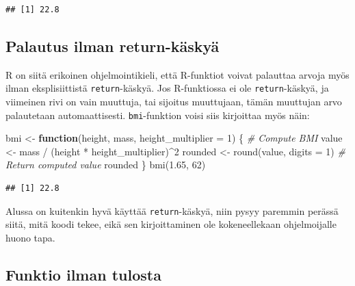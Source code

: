 \documentclass[
]{book}
\newenvironment{Shaded}{\begin{snugshade}}{\end{snugshade}}
\newcommand{\AttributeTok}[1]{\textcolor[rgb]{0.77,0.63,0.00}{#1}}
\newcommand{\CommentTok}[1]{\textcolor[rgb]{0.56,0.35,0.01}{\textit{#1}}}
\newcommand{\ControlFlowTok}[1]{\textcolor[rgb]{0.13,0.29,0.53}{\textbf{#1}}}
\newcommand{\DecValTok}[1]{\textcolor[rgb]{0.00,0.00,0.81}{#1}}
\newcommand{\FloatTok}[1]{\textcolor[rgb]{0.00,0.00,0.81}{#1}}
\newcommand{\FunctionTok}[1]{\textcolor[rgb]{0.00,0.00,0.00}{#1}}
\newcommand{\NormalTok}[1]{#1}
\newcommand{\OtherTok}[1]{\textcolor[rgb]{0.56,0.35,0.01}{#1}}
\newcommand{\SpecialCharTok}[1]{\textcolor[rgb]{0.00,0.00,0.00}{#1}}
\begin{document}
\begin{Shaded}
\end{Shaded}

\begin{verbatim}
## [1] 22.8
\end{verbatim}

\hypertarget{palautus-ilman-return-kuxe4skyuxe4}{%
\subsection{Palautus ilman return-käskyä}\label{palautus-ilman-return-kuxe4skyuxe4}}

R on siitä erikoinen ohjelmointikieli, että R-funktiot voivat palauttaa arvoja myös ilman eksplisiittistä \texttt{return}-käskyä. Jos R-funktiossa ei ole \texttt{return}-käskyä, ja viimeinen rivi on vain muuttuja, tai sijoitus muuttujaan, tämän muuttujan arvo palautetaan automaattisesti. \texttt{bmi}-funktion voisi siis kirjoittaa myös näin:

\begin{Shaded}
\begin{Highlighting}[]
\NormalTok{bmi }\OtherTok{\textless{}{-}} \ControlFlowTok{function}\NormalTok{(height, mass, }\AttributeTok{height\_multiplier =} \DecValTok{1}\NormalTok{) \{}
  \CommentTok{\# Compute BMI}
\NormalTok{  value }\OtherTok{\textless{}{-}}\NormalTok{ mass }\SpecialCharTok{/}\NormalTok{ (height }\SpecialCharTok{*}\NormalTok{ height\_multiplier)}\SpecialCharTok{\^{}}\DecValTok{2}
\NormalTok{  rounded }\OtherTok{\textless{}{-}} \FunctionTok{round}\NormalTok{(value, }\AttributeTok{digits =} \DecValTok{1}\NormalTok{)}
  \CommentTok{\# Return computed value}
\NormalTok{  rounded}
\NormalTok{\}}
\FunctionTok{bmi}\NormalTok{(}\FloatTok{1.65}\NormalTok{, }\DecValTok{62}\NormalTok{)}
\end{Highlighting}
\end{Shaded}

\begin{verbatim}
## [1] 22.8
\end{verbatim}

Alussa on kuitenkin hyvä käyttää \texttt{return}-käskyä, niin pysyy paremmin perässä siitä, mitä koodi tekee, eikä sen kirjoittaminen ole kokeneellekaan ohjelmoijalle huono tapa.

\hypertarget{funktio-ilman-tulosta}{%
\subsection{Funktio ilman tulosta}\label{funktio-ilman-tulosta}}
\end{document}
